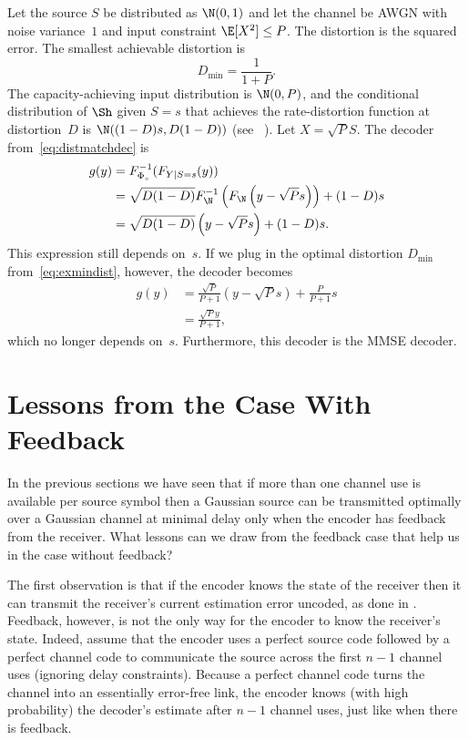 \begin{example}
  Let the source $S$ be distributed as $\N(0,1)$ and let the channel be AWGN
  with noise variance~$1$ and input constraint $\E[X^2] \le P$.
  The distortion is the squared error. The smallest achievable distortion is
  \begin{equation}
    \label{eq:exmindist}
    D_{\min} = \frac{1}{1 + P}.
  \end{equation}
  The capacity-achieving input distribution is $\N(0,P)$, and the conditional
  distribution of $\Sh$ given $S=s$ that achieves the rate-distortion function
  at distortion~$D$ is $\N((1-D)s, D(1-D))$ (see \eg~\cite{CoverT1991}).
  Let $X = \sqrt{P}S$.  The decoder from~\eqref{eq:distmatchdec} is
  \begin{align*}
    g(y) &= F_{\Phi_s}^{-1} (F_{Y|S=s}(y)) \\
    &= \sqrt{D(1-D)} F_{\N}^{-1} \left( F_{\N}\left( y-\sqrt{P}s
    \right) \right) + (1-D)s \\
    &= \sqrt{D(1-D)} \left( y-\sqrt{P}s \right) + (1-D)s.
  \end{align*}
  This expression still depends on~$s$. If we plug in the optimal distortion
  $D_{\min}$ from~\eqref{eq:exmindist}, however, the decoder becomes
  \begin{align*}
    g(y) &= \frac{\sqrt{P}}{P+1} (y - \sqrt{P}s) + \frac{P}{P +
    1}s \\ 
    &= \frac{\sqrt{P}y}{P + 1},
  \end{align*}
  which no longer depends on~$s$. Furthermore, this decoder is the MMSE decoder.
\end{example}


\section{Lessons from the Case With Feedback}

In the previous sections we have seen that if more than one channel use is
available per source symbol then a Gaussian source can be transmitted optimally
over a Gaussian channel at minimal delay only when the encoder has feedback from
the receiver.  What lessons can we draw from the feedback case that help us in
the case without feedback?

The first observation is that if the encoder knows the state of the receiver
then it can transmit the receiver's current estimation error uncoded, as done in
. Feedback, however, is not the only way for the encoder to know
the receiver's state. Indeed, assume that the encoder uses a perfect source code
followed by a perfect channel code to communicate the source across the first
$n-1$ channel uses (ignoring delay constraints). Because a perfect channel code
turns the channel into an essentially error-free link, the encoder knows (with
high probability) the decoder's estimate after $n-1$ channel uses, just like
when there is feedback.

